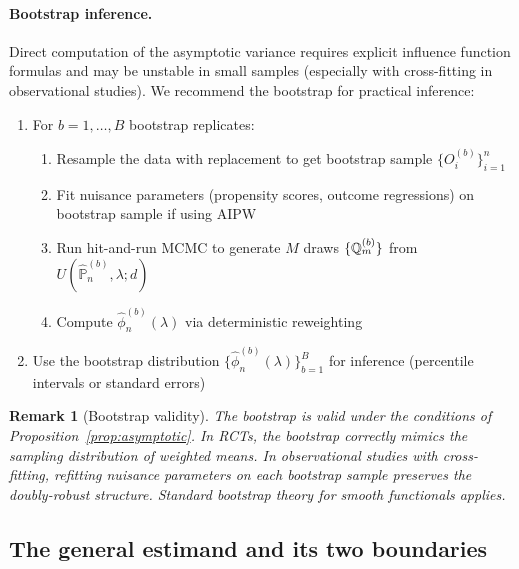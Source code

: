\documentclass{article}
\newtheorem{remark}{Remark}
\newcommand{\PP}{\mathbb{P}}
\begin{document}
\paragraph{Bootstrap inference.}
Direct computation of the asymptotic variance requires explicit influence function formulas and may be
unstable in small samples (especially with cross-fitting in observational studies). We recommend the bootstrap for practical inference:
\begin{enumerate}
    \item For $b = 1, \ldots, B$ bootstrap replicates:
          \begin{enumerate}
              \item Resample the data with replacement to get bootstrap sample $\{O_i^{(b)}\}_{i=1}^n$
              \item Fit nuisance parameters (propensity scores, outcome regressions) on bootstrap sample if using AIPW
              \item Run hit-and-run MCMC to generate $M$ draws $\{\mathbb{Q}_m^{(b)}\}$ from $U(\hat{\PP}_n^{(b)}, \lambda; d)$
              \item Compute $\hat{\phi}_n^{(b)}(\lambda)$ via deterministic reweighting
          \end{enumerate}
    \item Use the bootstrap distribution $\{\hat{\phi}_n^{(b)}(\lambda)\}_{b=1}^B$
          for inference (percentile intervals or standard errors)
\end{enumerate}

\begin{remark}[Bootstrap validity]
The bootstrap is valid under the conditions of Proposition~\ref{prop:asymptotic}. In RCTs, the bootstrap correctly mimics the sampling distribution of weighted means. In observational studies with cross-fitting, refitting nuisance parameters on each bootstrap sample preserves the doubly-robust structure. Standard bootstrap theory for smooth functionals applies.
\end{remark}

\subsection{The general estimand and its two boundaries}\label{sec:general}
\end{document}
